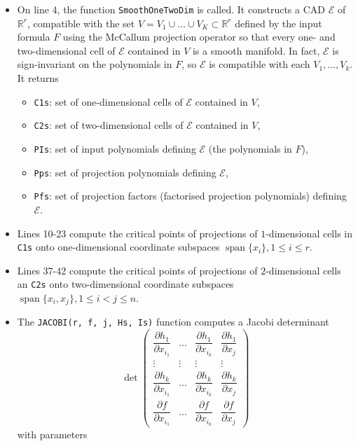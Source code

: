 \documentclass[
]{book}
\providecommand{\tightlist}{%
  \setlength{\itemsep}{0pt}\setlength{\parskip}{0pt}}
\theoremstyle{definition}
\theoremstyle{definition}
\theoremstyle{definition}
\theoremstyle{definition}
\theoremstyle{remark}
\begin{document}
\begin{itemize}
\item
  On line 4, the function \texttt{SmoothOneTwoDim} is called. It constructs a CAD \(\mathcal{E}\) of \(\mathbb{R}^r\), compatible with the set \(V = V_1\cup\ldots\cup V_K \subset \mathbb{R}^r\) defined by the input formula \(F\) using the McCallum projection operator so that every one- and two-dimensional cell of \(\mathcal{E}\) contained in \(V\) is a smooth manifold. In fact, \(\mathcal{E}\) is sign-invariant on the polynomials in \(F\), so \(\mathcal{E}\) is compatible with each \(V_1,\ldots,V_k\). It returns

  \begin{itemize}
  \tightlist
  \item
    \texttt{C1s}: set of one-dimensional cells of \(\mathcal{E}\) contained in \(V\),
  \item
    \texttt{C2s}: set of two-dimensional cells of \(\mathcal{E}\) contained in \(V\),
  \item
    \texttt{PIs}: set of input polynomials defining \(\mathcal{E}\) (the polynomials in \(F\)),
  \item
    \texttt{Pps}: set of projection polynomials defining \(\mathcal{E}\),
  \item
    \texttt{Pfs}: set of projection factors (factorised projection polynomials) defining \(\mathcal{E}\).
  \end{itemize}
\item
  Lines 10-23 compute the critical points of projections of \(1\)-dimensional cells in \texttt{C1s} onto one-dimensional coordinate subspaces \({\operatorname{span} \{x_i\}}, 1 \le i \le r\).
\item
  Lines 37-42 compute the critical points of projections of \(2\)-dimensional cells an \texttt{C2s} onto two-dimensional coordinate subspaces \({\operatorname{span} \{x_i,x_j\}}, 1 \le i < j \le n\).
\item
  The \texttt{JACOBI(r,\ f,\ j,\ Hs,\ Is)} function computes a Jacobi determinant \[
  \det \begin{pmatrix}\dfrac{\partial h_{1}}{\partial x_{i_{1}}} & \ldots & \dfrac{\partial h_{1}}{\partial x_{i_{k}}} & \dfrac{\partial h_{1}}{\partial x_{j}}\\
  \vdots & \vdots & \vdots & \vdots\\
  \dfrac{\partial h_{k}}{\partial x_{i_{1}}} & \ldots & \dfrac{\partial h_{k}}{\partial x_{i_{k}}} & \dfrac{\partial h_{k}}{\partial x_{j}}\\
  \dfrac{\partial f}{\partial x_{i_{1}}} & \ldots & \dfrac{\partial f}{\partial x_{i_{k}}} & \dfrac{\partial f}{\partial x_{j}}
  \end{pmatrix}
  \] with parameters


\end{itemize}
\end{document}
